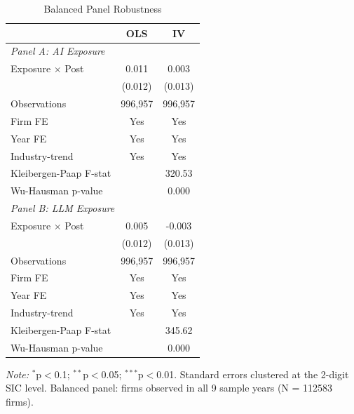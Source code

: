 \begin{table}[!ht]
\centering
\caption{Balanced Panel Robustness}
\centering
\begin{threeparttable}
\begin{tabular}[t]{lcc}
\toprule
 & OLS & IV\\
\midrule
\multicolumn{3}{l}{\textit{Panel A: AI Exposure}}\\
\hline
\hspace{1em}Exposure $\times$ Post & 0.011 & 0.003\\
\hspace{1em} & (0.012) & \vphantom{1} (0.013)\\
\hspace{1em}Observations & 996,957 & \vphantom{1} 996,957\\
\hspace{1em}Firm FE & Yes & \vphantom{1} Yes\\
\hspace{1em}Year FE & Yes & \vphantom{1} Yes\\
\hspace{1em}Industry-trend& Yes & \vphantom{1} Yes\\
\hspace{1em}Kleibergen-Paap F-stat &  & 320.53\\
\hspace{1em}Wu-Hausman p-value &  & \vphantom{1} 0.000\\
\multicolumn{3}{l}{\textit{Panel B: LLM Exposure}}\\
\hline
\hspace{1em}Exposure $\times$ Post & 0.005 & -0.003\\
\hspace{1em} & (0.012) & (0.013)\\
\hspace{1em}Observations & 996,957 & 996,957\\
\hspace{1em}Firm FE & Yes & Yes\\
\hspace{1em}Year FE & Yes & Yes\\

\hspace{1em}Industry-trend& Yes & \vphantom{1} Yes\\
\hspace{1em}Kleibergen-Paap F-stat &  & 345.62\\
\hspace{1em}Wu-Hausman p-value &  & 0.000\\
\midrule
\midrule
\bottomrule
\end{tabular}
\begin{tablenotes}
\item \textit{Note:} $^{*}$p$<$0.1; $^{**}$p$<$0.05; $^{***}$p$<$0.01. Standard errors clustered at the 2-digit SIC level. Balanced panel: firms observed in all 9 sample years (N = 112583 firms).
\end{tablenotes}
\end{threeparttable}
\end{table}
